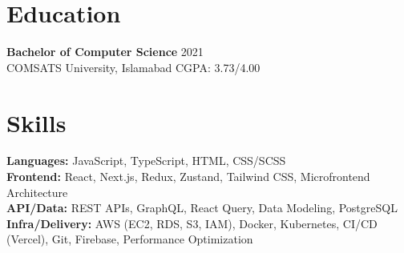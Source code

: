 \documentclass[9pt,letterpaper]{article}
\begin{document}
\section*{Education}
\textbf{Bachelor of Computer Science} \hfill 2021 \\
COMSATS University, Islamabad \hfill CGPA: 3.73/4.00

\section*{Skills}
\textbf{Languages:} JavaScript, TypeScript, HTML, CSS/SCSS \\
\textbf{Frontend:} React, Next.js, Redux, Zustand, Tailwind CSS, Microfrontend Architecture \\
\textbf{API/Data:} REST APIs, GraphQL, React Query, Data Modeling, PostgreSQL \\
\textbf{Infra/Delivery:} AWS (EC2, RDS, S3, IAM), Docker, Kubernetes, CI/CD (Vercel), Git, Firebase, Performance Optimization
\end{document}
